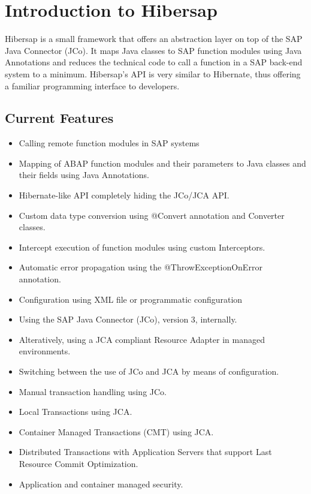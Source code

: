 \chapter{Introduction to Hibersap}

  Hibersap is a small framework that offers an abstraction layer on top of the SAP Java Connector (JCo).
  It maps Java classes to SAP function modules using Java Annotations and reduces the technical code
  to call a function in a SAP back-end system to a minimum. 
  Hibersap's API is very similar to Hibernate, thus offering a familiar programming interface to developers.  

\section*{Current Features}

\begin{itemize}
  \item Calling remote function modules in SAP systems
  \item Mapping of ABAP function modules and their parameters to Java classes and their fields using Java Annotations.
  \item Hibernate-like API completely hiding the JCo/JCA API.
  \item Custom data type conversion using @Convert annotation and Converter classes.
  \item Intercept execution of function modules using custom Interceptors.
  \item Automatic error propagation using the @ThrowExceptionOnError annotation.
  \item Configuration using XML file or programmatic configuration
  \item Using the SAP Java Connector (JCo), version 3, internally.
  \item Alteratively, using a JCA compliant Resource Adapter in managed environments.
  \item Switching between the use of JCo and JCA by means of configuration.
  \item Manual transaction handling using JCo.
  \item Local Transactions using JCA.
  \item Container Managed Transactions (CMT) using JCA.
  \item Distributed Transactions with Application Servers that support Last Resource Commit Optimization.
  \item Application and container managed security.
\end{itemize}


